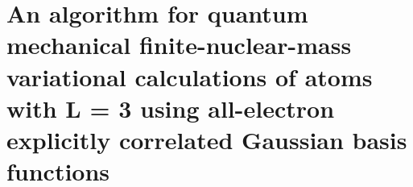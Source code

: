 \chapter{An algorithm for quantum mechanical finite-nuclear-mass variational calculations of atoms with L = 3 using all-electron explicitly correlated Gaussian basis functions\label{apndx3}}



